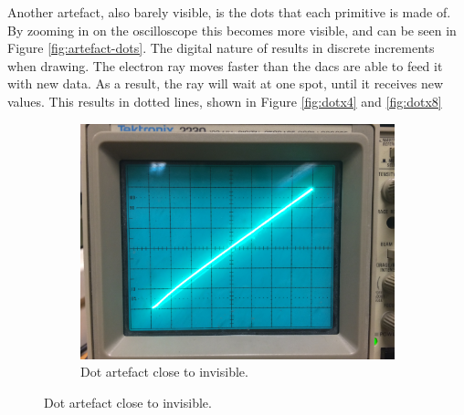 Another artefact, also barely visible, is the dots that each primitive is made of.
By zooming in on the oscilloscope this becomes more visible, and can be seen in Figure \ref{fig:artefact-dots}.
The digital nature of \vthreek results in discrete increments when drawing.
The electron ray moves faster than the \gls{dac}s are able to feed it with new data.
As a result, the ray will wait at one spot, until it receives new values.
This results in dotted lines, shown in Figure \ref{fig:dotx4} and \ref{fig:dotx8}
	
\begin{figure}[h!]
   	\centering
    \begin{subfigure}[b]{\textwidth}
   		\centering
       	\includegraphics[height=0.4\textheight]{images/dots_x1.jpg}
       	\caption{Dot artefact close to invisible.}
       	\label{fig:dotx1}
    \end{subfigure}
\end{figure}

